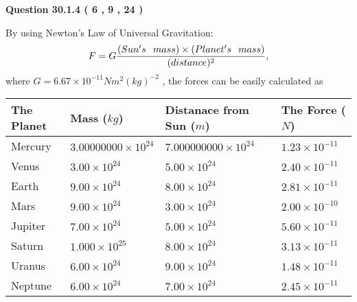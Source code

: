 \documentclass[12pt]{article}
\begin{document}
 
 
  
\vspace{0.2in}
  
{\textbf{\Large{Question
30.1.4 
 (           6 ,           9 ,          24 )
}}}
  
  
 
 

By using Newton's Law of Universal Gravitation:
\[
F=G \frac{(Sun's \hspace{0.1in} mass) \times (Planet's \hspace{0.1in} mass)} { (distance)^2},
\]
where
$ G= %
6.67 \times 10^{-11}N m^{2}(kg)^{-2}$ , the forces can be easily calculated as
 
\vspace{0.2in}
 
 
\begin{tabular}{|l|l|l|l|}
\hline
The Planet & Mass ($kg$) & Distanace from Sun ($m$) & The Force ($N$)\\
\hline
Mercury  &
           $ %
3.00000000 \times 10^{24} $   &
             $ %
7.000000000 \times 10^{24} $    & $ %
1.23 \times 10^{-11} $
\\  \hline
Venus    &
           $  %
3.00 \times 10^{24}  $     &
             $ %
5.00 \times 10^{24} $    & $ %
2.40 \times 10^{-11} $
\\  \hline
Earth    &
           $  %
9.00 \times 10^{24}  $     &
             $ %
8.00 \times 10^{24} $    & $ %
2.81 \times 10^{-11} $
\\   \hline
Mars     &
           $  %
9.00 \times 10^{24} $     &
             $ %
3.00 \times 10^{24} $    & $ %
2.00 \times 10^{-10} $
\\   \hline
Jupiter  &
           $  %
7.00 \times 10^{24} $    &
             $ %
5.00 \times 10^{24} $    & $ %
5.60 \times 10^{-11} $
\\  \hline
Saturn   &
           $  %
1.000 \times 10^{25} $    &
             $ %
8.00 \times 10^{24}  $    & $ %
3.13 \times 10^{-11} $
\\  \hline
Uranus   &
           $  %
6.00 \times 10^{24} $    &
             $ %
9.00 \times 10^{24} $    & $ %
1.48 \times 10^{-11} $
\\  \hline
Neptune  &
           $  %
6.00 \times 10^{24} $    &
             $ %
7.00 \times 10^{24} $    & $ %
2.45 \times 10^{-11} $
\\  \hline
 
\end{tabular}
 
\end{document}
